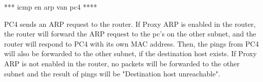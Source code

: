 *** icmp en arp van pc4 ****

PC4 sends an ARP request to the router. 
If Proxy ARP is enabled in the router, the router will forward the ARP request to the pc's on the other subnet, and the router will respond to PC4 with its own MAC address. Then, the pings from PC4 will also be forwarded to the other subnet, if the destination host exists.
If Proxy ARP is not enabled in the router, no packets will be forwarded to the other subnet and the result of pings will be "Destination host unreachable".